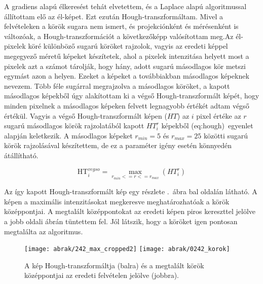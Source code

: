 \documentclass[a4paper,12pt]{article}
\begin{document}
A gradiens alapú élkeresést tehát elvetettem, és a Laplace alapú algoritmussal állítottam elő az él-képet. Ezt ezután Hough-transzformáltam. Mivel a felvételeken a körök sugara nem ismert, és projekciónként és mérésenként is változóak, a Hough-transzformációt a következőképp valósítottam meg.Az él-pixelek köré különböző sugarú köröket rajzolok, vagyis az eredeti képpel megegyező méretű képeket készítetek, ahol a pixelek intenzitása helyett most a pixelek azt a számot tárolják, hogy hány, adott sugarú másodlagos kör metszi egymást azon a helyen. Ezeket a képeket a továbbiakban másodlagos képeknek nevezem. Több féle sugárral megrajzolva a másodlagos köröket, a kapott másodlagos képekből úgy alakítottam ki a végső Hough-transzformált képét, hogy minden pixelnek a másodlagos képeken felvett legnagyobb értékét adtam végső értékül. Vagyis a végső Hough-transzformált képen ($HT$) az $i$ pixel értéke az $r$ sugarú másodlagos körök rajzolatából kapott $HT^r_i$ képekből \aref({eq:hough})~egyenlet alapján keletkezik. A másodlagos képeket $r_{min} = 5$ és $r_{max}=25$ közötti sugarú körök rajzolásával készítettem, de ez a paraméter igény esetén könnyedén átállítható.


\begin{equation}
\label{eq:hough}
\text{HT}_i^{vegso} = \max_{r_{min}<=r<=r_{max}} \left(HT^r_i \right)
\end{equation}


Az így kapott Hough-transzformált kép egy részlete .~ábra bal oldalán látható. A képen a maximális intenzitásokat megkeresve meghatározhatóak a körök középpontjai. A megtalált középpontokat az eredeti képen piros kereszttel jelölve a jobb oldali ábrán tüntettem fel. Jól látszik, hogy a köröket igen pontosan megtalálta az algoritmus.

\begin{figure}[htbp]
\center
\texttt{[image: abrak/242\_max\_cropped2]}
\texttt{[image: abrak/0242\_korok]}
\caption{A kép Hough-transzformáltja (balra) és a megtalált körök középpontjai az eredeti felvételen jelölve (jobbra).}
\label{fig:242_hough}
\end{figure}
\end{document}
